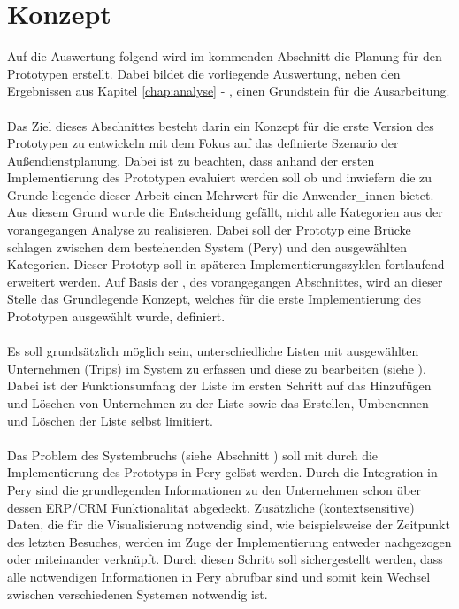 \documentclass[Bachelorarbeit.tex]{subfiles}
\begin{document}
\section{Konzept}
\label{chap:entwicklung:sec:konzept}
Auf die Auswertung folgend wird im kommenden Abschnitt die Planung für den Prototypen erstellt.
Dabei bildet die vorliegende Auswertung, neben den Ergebnissen aus Kapitel \ref{chap:analyse} - , einen Grundstein für die Ausarbeitung.\\
\\
Das Ziel dieses Abschnittes besteht darin ein Konzept für die erste Version des Prototypen zu entwickeln mit dem Fokus auf das definierte Szenario der Außendienstplanung. 
Dabei ist zu beachten, dass anhand der ersten Implementierung des Prototypen evaluiert werden soll ob und inwiefern die zu Grunde liegende  dieser Arbeit einen Mehrwert für die Anwender\_innen bietet.
Aus diesem Grund wurde die Entscheidung gefällt, nicht alle Kategorien aus der vorangegangen Analyse zu realisieren.
Dabei soll der Prototyp eine Brücke schlagen zwischen dem bestehenden System (Pery) und den ausgewählten Kategorien.
Dieser Prototyp soll in späteren Implementierungszyklen fortlaufend erweitert werden.
Auf Basis der , des vorangegangen Abschnittes, wird an dieser Stelle das Grundlegende Konzept, welches für die erste Implementierung des Prototypen ausgewählt wurde, definiert. \\
\\
Es soll grundsätzlich möglich sein, unterschiedliche Listen mit ausgewählten Unternehmen (Trips) im System zu erfassen und diese zu bearbeiten (siehe ).
Dabei ist der Funktionsumfang der Liste im ersten Schritt auf das Hinzufügen und Löschen von Unternehmen zu der Liste sowie das Erstellen, Umbenennen und Löschen der Liste selbst limitiert.\\
\\
Das Problem des Systembruchs (siehe Abschnitt ) soll mit durch die Implementierung des Prototyps in Pery gelöst werden. 
Durch die Integration in Pery sind die grundlegenden Informationen zu den Unternehmen schon über dessen \ac{ERP}/\ac{CRM} Funktionalität abgedeckt. 
Zusätzliche (kontextsensitive) Daten, die für die Visualisierung notwendig sind, wie beispielsweise der Zeitpunkt des letzten Besuches, werden im Zuge der Implementierung entweder nachgezogen oder miteinander verknüpft.
Durch diesen Schritt soll sichergestellt werden, dass alle notwendigen Informationen in Pery abrufbar sind und somit kein Wechsel zwischen verschiedenen Systemen notwendig ist.\\
\end{document}
